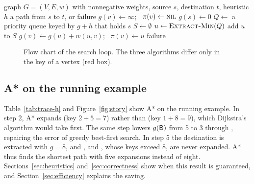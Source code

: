 \begin{algorithm}[htbp]
  \caption{A* search}\label{alg:astar}
  \begin{algorithmic}[1]
    \Require graph $G = (V,E,w)$ with nonnegative weights, source $s$, destination $t$,
      heuristic $h$
    \Ensure a path from $s$ to $t$, or failure
        \State $g(v) \gets \infty$; \ $\pi(v) \gets \textsc{nil}$
      \EndFor
      \State $g(s) \gets 0$
      \State $Q \gets$ a priority queue keyed by $g + h$ that holds $s$
      \State $S \gets \emptyset$
        \State $u \gets \Call{Extract-Min}{Q}$
          \State \Return {}
        \EndIf
        \State add $u$ to $S$
            \State $g(v) \gets g(u) + w(u,v)$; \ $\pi(v) \gets u$
            \State {}
          \EndIf
        \EndFor
      \EndWhile
      \State \Return failure
    \EndProcedure
  \end{algorithmic}
\end{algorithm}

\begin{figure}[htbp]
  \centering
  
  \caption{Flow chart of the search loop. The three algorithms differ only in
    the key of a vertex (red box).}\label{fig:astar-flow}
\end{figure}

\subsection{A* on the running example}\label{sec:worked}

Table~\ref{tab:trace-h} and Figure~\ref{fig:story} show A* on the running
example. In step 2, A* expands  (key $2 + 5 = 7$) rather than 
(key $1 + 8 = 9$), which Dijkstra's algorithm would take first. The same step
lowers $g(\textsf{B})$ from 5 to 3 through , repairing the error of greedy
best-first search. In step 5 the destination is extracted with $g = 8$, and
,  and , whose keys exceed 8, are never expanded. A* thus
finds the shortest path with five expansions instead of eight.
Sections~\ref{sec:heuristics} and~\ref{sec:correctness} show when this result is
guaranteed, and Section~\ref{sec:efficiency} explains the saving.

